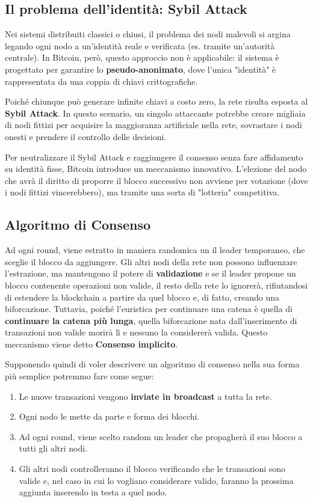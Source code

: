\subsection*{Il problema dell'identità: Sybil Attack}
Nei sistemi distribuiti classici o chiusi, il problema dei nodi malevoli si argina legando ogni nodo a un'identità reale e verificata (es. tramite un'autorità centrale). In Bitcoin, però, questo approccio non è applicabile: il sistema è progettato per garantire lo \textbf{pseudo-anonimato}, dove l'unica "identità" è rappresentata da una coppia di chiavi crittografiche.

Poiché chiunque può generare infinite chiavi a costo zero, la rete risulta esposta al \textbf{Sybil Attack}. In questo scenario, un singolo attaccante potrebbe creare migliaia di nodi fittizi per acquisire la maggioranza artificiale nella rete, sovrastare i nodi onesti e prendere il controllo delle decisioni.

Per neutralizzare il Sybil Attack e raggiungere il consenso senza fare affidamento su identità fisse, Bitcoin introduce un meccanismo innovativo. L'elezione del nodo che avrà il diritto di proporre il blocco successivo non avviene per votazione (dove i nodi fittizi vincerebbero), ma tramite una sorta di "lotteria" competitiva.
\subsection*{Algoritmo di Consenso}
Ad ogni round, viene estratto in maniera randomica un il leader temporaneo, che sceglie il blocco da aggiungere. Gli altri nodi della rete non possono influenzare l'estrazione, ma mantengono il potere di \textbf{validazione} e se il leader propone un blocco contenente operazioni non valide, il resto della rete lo ignorerà, rifiutandosi di estendere la blockchain a partire da quel blocco e, di fatto, creando una biforcazione. Tuttavia, poiché l'euristica per continuare una catena è quella di \textbf{continuare la catena più lunga}, quella biforcazione nata dall'inserimento di transazioni non valide morirà lì e nessuno la considererà valida. Questo meccanismo viene detto \textbf{Consenso implicito}.

Supponendo quindi di voler descrivere un algoritmo di consenso nella sua forma più semplice potremmo fare come segue:
\begin{enumerate}
    \item Le nuove transazioni vengono \textbf{inviate in broadcast} a tutta la rete.
    \item Ogni nodo le mette da parte e forma dei blocchi.
    \item Ad ogni round, viene scelto random un leader che propagherà il suo blocco a tutti gli altri nodi.
    \item Gli altri nodi controlleranno il blocco verificando che le transazioni sono valide e, nel caso in cui lo vogliano considerare valido, faranno la prossima aggiunta inserendo in testa a quel nodo.
\end{enumerate}

